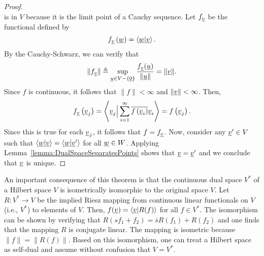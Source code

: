 \begin{proof}
\begin{equation*}
\end{equation*}
is in $V$ because it is the limit point of a Cauchy sequence.
Let $f_{\underline{v}}$ be the functional defined by
\begin{equation*}
f_{\underline{v}} \left( \underline{w} \right) = \left\langle \underline{w} | \underline{v} \right\rangle .
\end{equation*}
By the Cauchy-Schwarz, we can verify that
\[ \| f_{\underline{v}} \| \triangleq \sup_{\underline{u}\in V - \{ \underline{0} \}} \frac{f_{\underline{v}} (\underline{u})}{\| \underline{u} \|} = \| \underline{v} \|. \]
Since $f$ is continuous, it follows that $\| f \| < \infty$ and $\| \underline{v} \| < \infty$.
Then, 
\begin{equation*}
f_{\underline{v}} \left( \underline{v}_j \right) = \left\langle \underline{v}_j \Big| 
\sum_{i=1}^\infty \overline{f \left( \underline{v}_i \right)} \underline{v}_i \right\rangle
= f \left( \underline{v}_j \right) .
\end{equation*}
Since this is true for each $\underline{v}_j$, it follows that $f = f_{\underline{v}}$.
Now, consider any $\underline{v}' \in V$ such that $\left\langle \underline{w} | \underline{v} \right\rangle = \left\langle \underline{w} | \underline{v}' \right\rangle$ for all $\underline{w} \in W$.
Applying Lemma~\ref{lemma:DualSpaceSeparatesPoints} shows that $\underline{v} = \underline{v}'$ and we conclude that $\underline{v}$ is unique.
\end{proof}

An important consequence of this theorem is that the continuous dual space $V^*$ of a Hilbert space $V$ is isometrically isomorphic to the original space $V$.
Let $R \colon V^* \rightarrow V$ be the implied Riesz mapping from continuous linear functionals on $V$ (i.e., $V^*$) to elements of $V$.
Then, $f(\underline{v}) = \langle \underline{v} | R( f ) \rangle$ for all $f \in V^*$.
The isomorphism can be shown by verifying that $R( s f_1 + f_2 ) = \overline{s} R(f_1) + R(f_2)$ and one finds that the mapping $R$ is conjugate linear.
The mapping is isometric because $\| f \| = \| R(f) \|$.
Based on this isomorphism, one can treat a Hilbert space as self-dual and assume without confusion that $V=V^*$.


